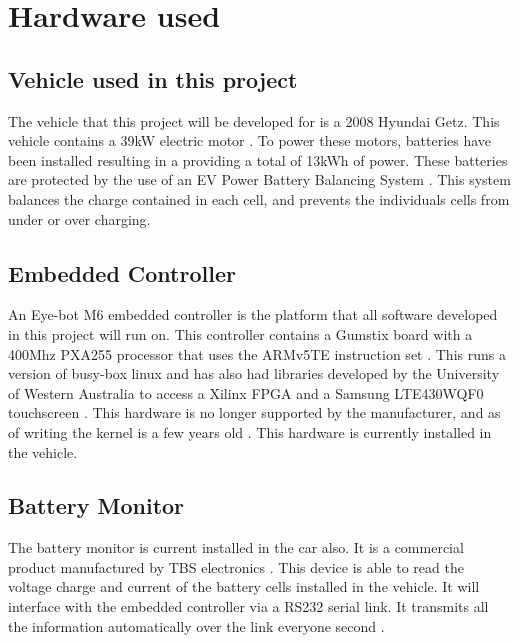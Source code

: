 \section{Hardware used} %


\subsection{Vehicle used in this project}

The vehicle that this project will be developed for is a 2008 Hyundai Getz. This vehicle contains a 39kW electric motor \cite{rev_eco}. To power these motors, batteries have been installed resulting in a providing a total of 13kWh of power. These batteries are protected by the use of an EV Power Battery Balancing System \cite{evpowerbms}.  This system balances the charge contained in each cell, and prevents the individuals cells from under or over charging.

\subsection{Embedded Controller}

An Eye-bot M6 embedded controller is the platform that all software developed in this project will run on. This controller contains a Gumstix board with a 400Mhz PXA255 processor that uses the ARMv5TE instruction set \cite{blackham_thesis}. This runs a version of busy-box linux and has also had libraries developed by the University of Western Australia to access a Xilinx FPGA and a Samsung LTE430WQF0 touchscreen \cite{macleod_thesis}. This hardware is no longer supported by the manufacturer, and as of writing the kernel is a few years old \cite{gumstix_buildroot}. This hardware is currently installed in the vehicle.

\subsection{Battery Monitor}

The battery monitor is current installed in the car also. It is a commercial product manufactured by TBS electronics \cite{tbs_features}. This device is able to read the voltage charge and current of the battery cells installed in the vehicle. It will interface with the embedded controller via a RS232 serial link. It transmits all the information automatically over the link everyone second \cite{tbs_specs}.

